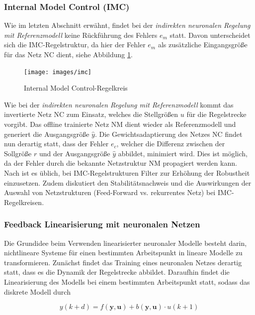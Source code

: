 \subsubsection{Internal Model Control (IMC)}

Wie im letzten Abschnitt erwähnt, findet bei der \textit{indirekten neuronalen Regelung mit Referenzmodell} keine Rückführung des Fehlers $e_m$ statt. Davon unterscheidet sich die IMC-Regelstruktur, da hier der Fehler $e_m$ als zusätzliche Eingangsgröße für das Netz NC dient, siehe Abbildung \ref{fig:imc}.


\begin{figure} [h]
	\centering
	\texttt{[image: images/imc]}
	\caption{Internal Model Control-Regelkreis \cite{Sklyarenko.2002}}
	\label{fig:imc}
\end{figure}

Wie bei der \textit{indirekten neuronalen Regelung mit Referenzmodell} kommt das invertierte Netz NC zum Einsatz, welches die Stellgrößen $u$ für die Regelstrecke vorgibt. Das offline trainierte Netz NM dient wieder als Referenzmodell und generiert die Ausgangsgröße $\hat{y}$. Die Gewichtsadaptierung des Netzes NC findet nun derartig statt, dass der Fehler $e_c$, welcher die Differenz zwischen der Sollgröße $r$ und der Ausgangsgröße $\hat{y}$ abbildet, minimiert wird. Dies ist möglich, da der Fehler durch die bekannte Netzstruktur NM propagiert werden kann. Nach \cite{Kambhampati.2000} ist es üblich, bei IMC-Regelstrukturen Filter zur Erhöhung der Robustheit einzusetzen. Zudem diskutiert \cite{Kambhampati.2000} den Stabilitätsnachweis und die Auswirkungen der Auswahl von Netzstrukturen (Feed-Forward vs. rekurrentes Netz) bei IMC-Regelkreisen. 


\subsubsection{Feedback Linearisierung mit neuronalen Netzen}

Die Grundidee beim Verwenden linearisierter neuronaler Modelle besteht darin, nichtlineare Systeme für einen bestimmten Arbeitspunkt in lineare Modelle zu transformieren. Zunächst findet das Training eines neuronalen Netzes derartig statt, dass es die Dynamik der Regelstrecke abbildet. Daraufhin findet die Linearisierung des Modells bei einem bestimmten Arbeitspunkt statt, sodass das diskrete Modell durch

\begin{equation} 
y(k+d) = f(\textbf{y},\textbf{u}) + b(\textbf{y},\textbf{u}) \cdot u(k+1)
\end{equation}

